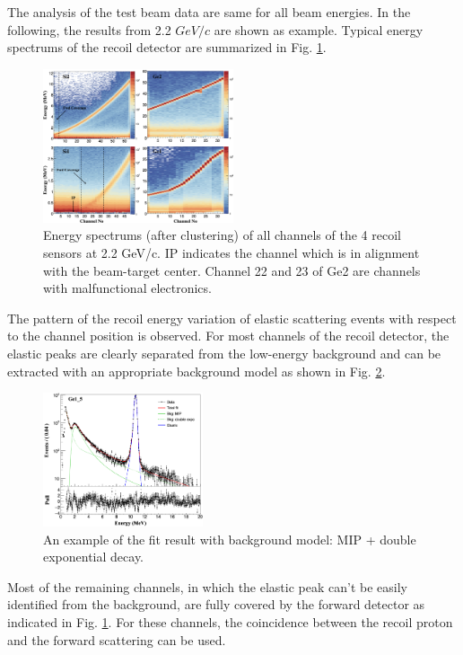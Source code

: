 \documentclass[number,5p]{elsarticle}
\begin{document}
The analysis of the test beam data are same for all beam energies.
In the following, the results from 2.2 $GeV/c$ are shown as example.
Typical energy spectrums of the recoil detector are summarized in Fig.
\ref{fig:e_map}.
\begin{figure}[htb!]
  \centering
  \includegraphics[width=0.5\textwidth]{./e_map.png}
  \caption{Energy spectrums (after clustering) of all channels of the 4 recoil
    sensors at 2.2 GeV/c.  IP indicates the channel which is in alignment with
    the beam-target center. Channel 22 and 23 of Ge2 are channels with
    malfunctional electronics.
  }
  \label{fig:e_map}
\end{figure}
The pattern of the recoil energy variation of elastic scattering events with respect to the channel position is observed.
For most channels of the recoil detector, the elastic peaks are clearly
separated from the low-energy background
and can be extracted with an appropriate background model as shown in Fig. \ref{fig:e_fit}.
\begin{figure}[h!]
  \centering
  \includegraphics[width=0.42\textwidth]{./e_fit.png}
  \caption{An example of the fit result with background model: MIP + double
    exponential decay.}
  \label{fig:e_fit}
\end{figure}
Most of the remaining channels, in which the elastic peak can't be easily identified from the
background, are fully covered by the forward detector as indicated in Fig. \ref{fig:e_map}.
For these channels, the coincidence between the recoil proton and the forward
scattering can be used.
\end{document}
